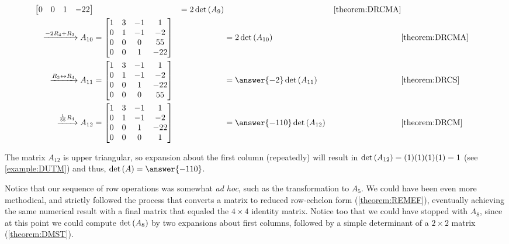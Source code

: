 \documentclass{ximera}
\begin{document}
\begin{example}
\begin{align*}
\begin{bmatrix}
           0 & 0 & 1 &-22
         \end{bmatrix}
                   &
           &=2\detname{A_9}&&\ref{theorem:DRCMA}\\
    \xrightarrow{\rowopadd{-2}{4}{3}}
    A_{10}&=
            \begin{bmatrix}
              1 & 3 &-1 & 1 \\
              0 & 1 &-1 &-2 \\
              0 & 0 & 0 &55 \\
              0 & 0 & 1 &-22
            \end{bmatrix}
                   &
           &=2\detname{A_{10}}&&\ref{theorem:DRCMA}\\
    \xrightarrow{\rowopswap{3}{4}}
    A_{11}&=
            \begin{bmatrix}
              1 & 3 &-1 & 1 \\
              0 & 1 &-1 &-2 \\
              0 & 0 & 1 &-22\\
              0 & 0 & 0 &55
            \end{bmatrix}
                   &
           &=\answer{-2}\detname{A_{11}}&&\ref{theorem:DRCS}\\
    \xrightarrow{\rowopmult{\frac{1}{55}}{4}}
    A_{12}&=
            \begin{bmatrix}
              1 & 3 &-1 & 1 \\
              0 & 1 &-1 &-2 \\
              0 & 0 & 1 &-22\\
              0 & 0 & 0 & 1
            \end{bmatrix}
                   &
           &=\answer{-110}\detname{A_{12}}&&\ref{theorem:DRCM}\\
  \end{align*}

  The matrix $A_{12}$ is upper triangular, so expansion about the
  first column (repeatedly) will result in
  $\det\left(A_{12}\right)=(1)(1)(1)(1)=1$ (see \ref{example:DUTM}) and thus,
  $\detname{A}=\answer{-110}$.

  Notice that our sequence of row operations was somewhat \textit{ad
    hoc}, such as the transformation to $A_5$.  We could have been
  even more methodical, and strictly followed the process that
  converts a matrix to reduced row-echelon form (\ref{theorem:REMEF}),
  eventually achieving the same numerical result with a final matrix
  that equaled the $4\times 4$ identity matrix.  Notice too that we
  could have stopped with $A_8$, since at this point we could compute
  $\det\left(A_8\right)$ by two expansions about first columns, followed by a
  simple determinant of a $2\times 2$ matrix (\ref{theorem:DMST}).


\end{example}
\end{document}
